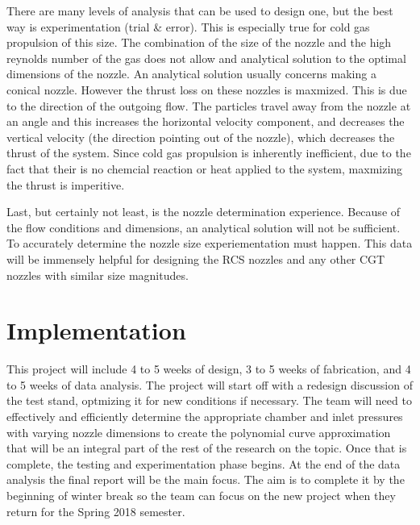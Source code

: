 \documentclass[conference]{IEEEtran} %
\begin{document}
There are many levels of
analysis that can be used to design one, but the best way is experimentation (trial \& error). This is especially true for cold gas propulsion of this
size. The combination of the size of the nozzle and the high reynolds number of the gas does not allow and analytical solution to the optimal dimensions
of the nozzle. An analytical solution usually concerns making a conical nozzle. However the thrust loss on these nozzles is maxmized. This is due to the
direction of the outgoing flow. The particles travel away from the nozzle at an angle and this increases the horizontal velocity component, and decreases the
vertical velocity (the direction pointing out of the nozzle), which decreases the thrust of the system. Since cold gas propulsion is inherently inefficient, due
to the fact that their is no chemcial reaction or heat applied to the system, maxmizing the thrust is imperitive.

Last, but certainly not least, is the nozzle determination experience. Because of the flow conditions and dimensions, an analytical solution will not be sufficient. To accurately determine
the nozzle size experiementation must happen. This data will be immensely helpful for designing the RCS nozzles and any other CGT nozzles with similar
size magnitudes.


\section{Implementation}
\label{sec:implementation}

This project will include 4 to 5 weeks of design, 3 to 5 weeks of fabrication, and 4 to 5 weeks of data analysis. The project will start off with a redesign discussion of the test stand, optmizing it for new conditions if necessary.
The team will need to effectively and efficiently determine the appropriate chamber and inlet pressures with varying
nozzle dimensions to create the polynomial curve approximation that will be an integral part of the rest of the research on the topic. Once that is complete, the
testing and experimentation phase begins. At the end of the data analysis the final report will be the main focus. The aim is to complete it by the beginning of winter break
so the team can focus on the new project when they return for the Spring 2018 semester.
\end{document}
